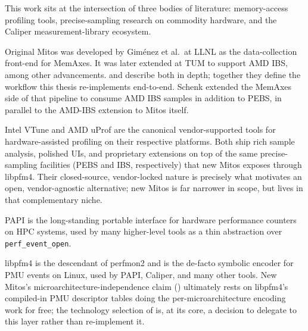 This work sits at the intersection of three bodies of literature: memory-access profiling tools, precise-sampling research on commodity hardware, and the Caliper measurement-library ecosystem.

Original Mitos\cite{mitosGh} was developed by Giménez et al.\ at LLNL\cite{memaxes} as the data-collection front-end for MemAxes. It was later extended at TUM to support AMD IBS, among other advancements\cite{mitosIBS,Vanecek2026}.  and  describe both in depth; together they define the workflow this thesis re-implements end-to-end. Schenk\cite{Schenk2023} extended the MemAxes side of that pipeline to consume AMD IBS samples in addition to PEBS, in parallel to the AMD-IBS extension to Mitos itself.

Intel VTune\cite{VtuneManual} and AMD uProf\cite{uProfGetStarted} are the canonical vendor-supported tools for hardware-assisted profiling on their respective platforms. Both ship rich sample analysis, polished UIs, and proprietary extensions on top of the same precise-sampling facilities (PEBS and IBS, respectively) that new Mitos exposes through libpfm4. Their closed-source, vendor-locked nature is precisely what motivates an open, vendor-agnostic alternative; new Mitos is far narrower in scope, but lives in that complementary niche.

PAPI\cite{PAPI} is the long-standing portable interface for hardware performance counters on HPC systems, used by many higher-level tools as a thin abstraction over \texttt{perf\_event\_open}. 

libpfm4\cite{libpfm4} is the descendant of perfmon2\cite{eranian2006perfmon2} and is the de-facto symbolic encoder for PMU events on Linux, used by PAPI, Caliper, and many other tools. New Mitos's microarchitecture-independence claim () ultimately rests on libpfm4's compiled-in PMU descriptor tables doing the per-microarchitecture encoding work for free; the technology selection of  is, at its core, a decision to delegate to this layer rather than re-implement it.
